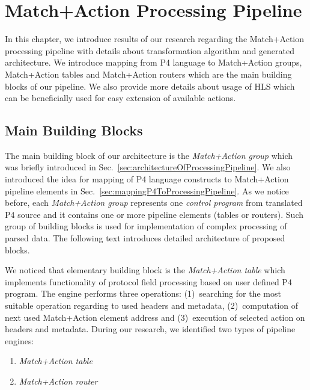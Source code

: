 \chapter{Match+Action Processing Pipeline}
\label{chap:matchActionProcessing}

\begin{chapterintro}
In this chapter, we introduce results of our research regarding the Match+Action processing pipeline with 
details about transformation algorithm and generated architecture. We introduce mapping from P4 language to 
Match+Action groups, Match+Action tables and Match+Action routers which are the main building blocks of our pipeline.
We also provide more details about usage of HLS which can be beneficially used for easy extension of available actions. 
\end{chapterintro}

\section{Main Building Blocks}

The main building block of our architecture is the \emph{Match+Action group} which was briefly introduced in 
Sec.~\ref{sec:architectureOfProcessingPipeline}. We also introduced the idea for mapping of P4 
language constructs to Match+Action pipeline elements in Sec.~\ref{sec:mappingP4ToProcessingPipeline}.
As we notice before, each \emph{Match+Action group} represents one \emph{control program} from 
translated P4 source and it contains one or more pipeline elements (tables or routers).
Such group of building blocks is used for implementation of complex 
processing of parsed data. The following text introduces detailed architecture of proposed blocks.

We noticed that elementary building block is the \emph{Match+Action table} which implements functionality
of protocol field processing based on user defined P4 program. 
The engine performs three operations: (1)~searching for the most suitable operation regarding
to used headers and metadata, (2)~computation of next used Match+Action element address and (3)~execution of selected 
action on headers and metadata. During our research, we identified two types of pipeline engines:
\begin{enumerate}
    \item \textit{Match+Action table}
    \item \textit{Match+Action router}
\end{enumerate}

